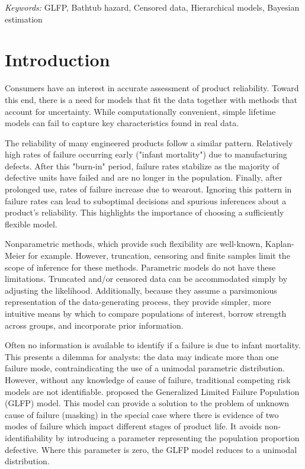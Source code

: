 \documentclass[12pt]{article}
\begin{document}
\noindent%
{\it Keywords:} GLFP, Bathtub hazard, Censored data, Hierarchical models, Bayesian estimation
\vfill

\newpage
\tableofcontents
\newpage
{} %
\section{Introduction}
Consumers have an interest in accurate assessment of product reliability. Toward this end, there is a need for models that fit the data together with methods that account for uncertainty.  While computationally convenient, simple lifetime models can fail to capture key characteristics found in real data.


The reliability of many engineered products follow a similar pattern. Relatively high rates of failure occurring early ("infant mortality") due to manufacturing defects.  After this "burn-in" period, failure rates stabilize as the majority of defective units have failed and are no longer in the population.  Finally, after prolonged use, rates of failure increase due to wearout.  Ignoring this pattern in failure rates can lead to suboptimal decisions and spurious inferences about a product's reliability. This highlights the importance of choosing a sufficiently flexible model.

Nonparametric methods, which provide such flexibility are well-known, Kaplan-Meier for example. However, truncation, censoring and finite samples limit the scope of inference for these methods. Parametric models do not have these limitations. Truncated and/or censored data can be accommodated simply by adjusting the likelihood. Additionally, because they assume a parsimonious representation of the data-generating process, they provide simpler, more intuitive means by which to compare populations of interest, borrow strength across groups, and incorporate prior information. 

Often no information is available to identify if a failure is due to infant mortality. This presents a dilemma for analysts: the data may indicate more than one failure mode, contraindicating the use of a unimodal parametric distribution. However, without any knowledge of cause of failure, traditional competing risk models are not identifiable. \citet{chan} proposed the Generalized Limited Failure Population (GLFP) model. This model can provide a solution to the problem of unknown cause of failure (masking) in the special case where there is evidence of two modes of failure which impact different stages of product life. It avoids non-identifiability by introducing a parameter representing the population proportion defective. Where this parameter is zero, the GLFP model reduces to a unimodal distribution. \\
\end{document}
